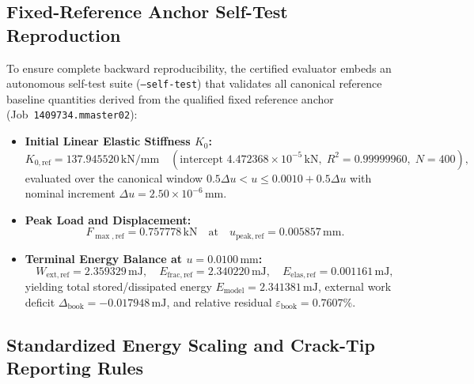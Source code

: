 \subsection{Fixed-Reference Anchor Self-Test Reproduction}
\label{subsec:stage14uq_selftest_reproduction}

To ensure complete backward reproducibility, the certified evaluator embeds an autonomous self-test suite (\texttt{--self-test}) that validates all canonical reference baseline quantities derived from the qualified fixed reference anchor (Job~\texttt{1409734.mmaster02}):
\begin{itemize}
    \item \textbf{Initial Linear Elastic Stiffness $K_0$:}
    \begin{equation}
    K_{0,\mathrm{ref}} = 137.945520\,\mathrm{kN/mm} \quad (\text{intercept } 4.472368\times 10^{-5}\,\mathrm{kN}, \; R^2 = 0.99999960, \; N = 400),
    \end{equation}
    evaluated over the canonical window $0.5\Delta u < u \le 0.0010 + 0.5\Delta u$ with nominal increment $\Delta u = 2.50\times 10^{-6}\,\mathrm{mm}$.
    \item \textbf{Peak Load and Displacement:}
    \begin{equation}
    F_{\max,\mathrm{ref}} = 0.757778\,\mathrm{kN} \quad \text{at} \quad u_{\mathrm{peak},\mathrm{ref}} = 0.005857\,\mathrm{mm}.
    \end{equation}
    \item \textbf{Terminal Energy Balance at $u = 0.0100\,\mathrm{mm}$:}
    \begin{equation}
    W_{\mathrm{ext},\mathrm{ref}} = 2.359329\,\mathrm{mJ}, \quad E_{\mathrm{frac},\mathrm{ref}} = 2.340220\,\mathrm{mJ}, \quad E_{\mathrm{elas},\mathrm{ref}} = 0.001161\,\mathrm{mJ},
    \end{equation}
    yielding total stored/dissipated energy $E_{\mathrm{model}} = 2.341381\,\mathrm{mJ}$, external work deficit $\Delta_{\mathrm{book}} = -0.017948\,\mathrm{mJ}$, and relative residual $\varepsilon_{\mathrm{book}} = 0.7607\%$.
\end{itemize}

\subsection{Standardized Energy Scaling and Crack-Tip Reporting Rules}
\label{subsec:stage14uq_energy_and_cracktip}

